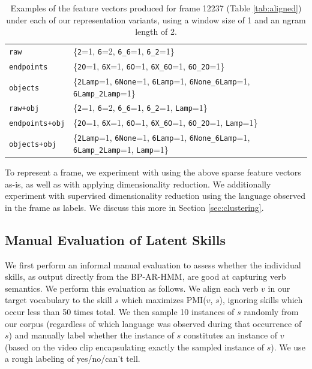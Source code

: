 \documentclass[11pt]{article}
\begin{document}
\begin{table}[ht!]
\centering
\begin{tabular}{|ll|}
\hline
\texttt{raw} & \{\texttt{2}=1, \texttt{6}=2, \texttt{6\_6}=1, \texttt{6\_2}=1\} \\
\texttt{endpoints} & \{\texttt{2O}=1, \texttt{6X}=1, \texttt{6O}=1, \texttt{6X\_6O}=1, \texttt{6O\_2O}=1\} \\
\texttt{objects} & \{\texttt{2Lamp}=1, \texttt{6None}=1, \texttt{6Lamp}=1, \texttt{6None\_6Lamp}=1, \texttt{6Lamp\_2Lamp}=1\} \\
\texttt{raw+obj} & \{\texttt{2}=1, \texttt{6}=2, \texttt{6\_6}=1, \texttt{6\_2}=1, \texttt{Lamp}=1\} \\
\texttt{endpoints+obj} & \{\texttt{2O}=1, \texttt{6X}=1, \texttt{6O}=1, \texttt{6X\_6O}=1, \texttt{6O\_2O}=1, \texttt{Lamp}=1\} \\
\texttt{objects+obj} & \{\texttt{2Lamp}=1, \texttt{6None}=1, \texttt{6Lamp}=1, \texttt{6None\_6Lamp}=1, \texttt{6Lamp\_2Lamp}=1, \texttt{Lamp}=1\} \\
\hline
\end{tabular}
\caption{Examples of the feature vectors produced for frame 12237 (Table \ref{tab:aligned}) under each of our representation variants, using a window size of 1 and an ngram length of 2.}
\label{tab:features}
\end{table}

To represent a frame, we experiment with using the above sparse feature vectors as-is, as well as with applying dimensionality reduction. We additionally experiment with supervised dimensionality reduction using the language observed in the frame as labels. We discuss this more in Section \ref{sec:clustering}.

\subsection{Manual Evaluation of Latent Skills}

We first perform an informal manual evaluation to assess whether the individual skills, as output directly from the BP-AR-HMM, are good at capturing verb semantics. We perform this evaluation as follows. We align each verb $v$ in our target vocabulary to the skill $s$ which maximizes PMI($v$, $s$), ignoring skills which occur less than 50 times total. We then sample 10 instances of $s$ randomly from our corpus (regardless of which language was observed during that occurrence of $s$) and manually label whether the instance of $s$ constitutes an instance of $v$ (based on the video clip encapsulating exactly the sampled instance of $s$). We use a rough labeling of yes/no/can't tell.
\end{document}
